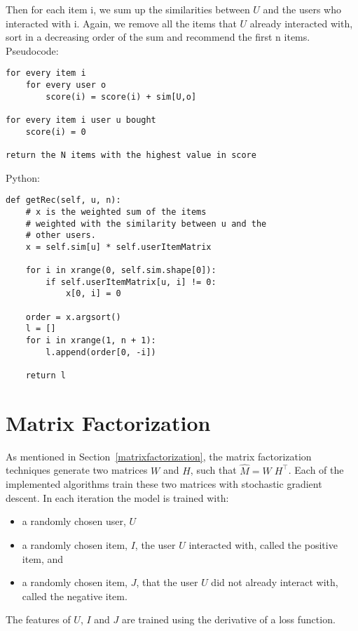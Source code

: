 Then for each item i, we sum up the similarities between $U$ and the
users who interacted with i. Again, we remove all the items that $U$ already interacted
with, sort in a decreasing order of the sum and recommend the first
n items.
Pseudocode:
\begin{lstlisting}[style=pseudocode]
for every item i 
    for every user o
        score(i) = score(i) + sim[U,o]

for every item i user u bought
    score(i) = 0

return the N items with the highest value in score
\end{lstlisting}
Python:
\begin{lstlisting}[style=python]
def getRec(self, u, n):
    # x is the weighted sum of the items
    # weighted with the similarity between u and the
    # other users.
    x = self.sim[u] * self.userItemMatrix

    for i in xrange(0, self.sim.shape[0]):
        if self.userItemMatrix[u, i] != 0:
            x[0, i] = 0

    order = x.argsort()
    l = []
    for i in xrange(1, n + 1):
        l.append(order[0, -i])

    return l
\end{lstlisting}

\section{Matrix Factorization}
As mentioned in Section~\ref{matrixfactorization}, the matrix factorization
techniques generate two matrices \(W\) and \(H\), such that \(\hat{M} = W\;H^\top\).
Each of the implemented algorithms train these two matrices with stochastic
gradient descent. In each iteration the model is trained with:
\begin{itemize} 
    \item a randomly chosen user, $U$
    \item a randomly chosen item, $I$, the user $U$ interacted with, called the positive item, and 
    \item a randomly chosen item, $J$, that the user $U$ did not already interact with, 
        called the negative item.
\end{itemize}
The features of $U$, $I$ and $J$ are trained using the derivative
of a loss function.

